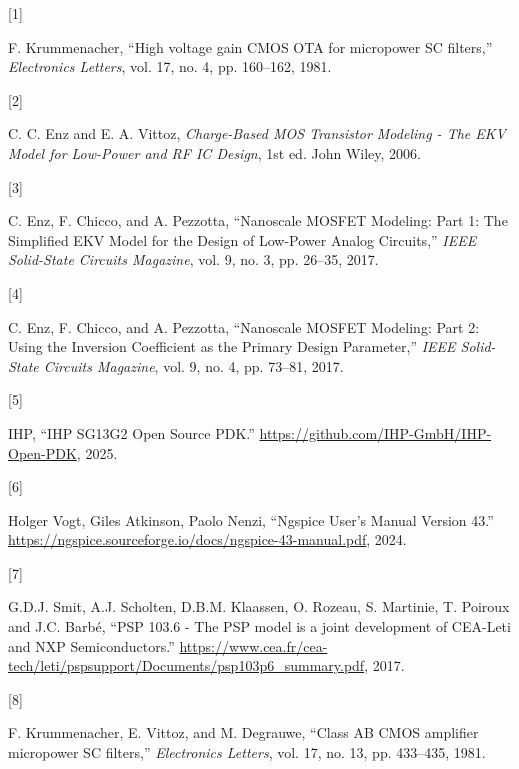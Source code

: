 \documentclass[
  a4paper,
  DIV=11,
  numbers=noendperiod]{scrreprt}
\newlength{\cslhangindent}
\newlength{\csllabelwidth}
\newenvironment{CSLReferences}[2] %
 {\begin{list}{}{%
  \setlength{\itemindent}{0pt}
  \setlength{\leftmargin}{0pt}
  \setlength{\parsep}{0pt}
  \ifodd #1
   \setlength{\leftmargin}{\cslhangindent}
   \setlength{\itemindent}{-1\cslhangindent}
  \fi
  \setlength{\itemsep}{#2\baselineskip}}}
 {\end{list}}
\newcommand{\CSLLeftMargin}[1]{\parbox[t]{\csllabelwidth}{\strut#1\strut}}
\newcommand{\CSLRightInline}[1]{\parbox[t]{\linewidth - \csllabelwidth}{\strut#1\strut}}
\begin{document}
\label{refs}
\begin{CSLReferences}{0}{0}
\CSLLeftMargin{{[}1{]} }%
\CSLRightInline{F. Krummenacher, {``{High voltage gain CMOS OTA for
micropower SC filters},''} \emph{Electronics Letters}, vol. 17, no. 4,
pp. 160--162, 1981.}

\CSLLeftMargin{{[}2{]} }%
\CSLRightInline{C. C. Enz and E. A. Vittoz, \emph{{Charge-Based MOS
Transistor Modeling - The EKV Model for Low-Power and RF IC Design}},
1st ed. John Wiley, 2006.}

\CSLLeftMargin{{[}3{]} }%
\CSLRightInline{C. Enz, F. Chicco, and A. Pezzotta, {``{Nanoscale MOSFET
Modeling: Part 1: The Simplified EKV Model for the Design of Low-Power
Analog Circuits},''} \emph{IEEE Solid-State Circuits Magazine}, vol. 9,
no. 3, pp. 26--35, 2017.}

\CSLLeftMargin{{[}4{]} }%
\CSLRightInline{C. Enz, F. Chicco, and A. Pezzotta, {``{Nanoscale MOSFET
Modeling: Part 2: Using the Inversion Coefficient as the Primary Design
Parameter},''} \emph{IEEE Solid-State Circuits Magazine}, vol. 9, no. 4,
pp. 73--81, 2017.}

\CSLLeftMargin{{[}5{]} }%
\CSLRightInline{IHP, {``{IHP SG13G2 Open Source PDK}.''}
\url{https://github.com/IHP-GmbH/IHP-Open-PDK}, 2025.}

\CSLLeftMargin{{[}6{]} }%
\CSLRightInline{Holger Vogt, Giles Atkinson, Paolo Nenzi, {``{Ngspice
User's Manual Version 43}.''}
\url{https://ngspice.sourceforge.io/docs/ngspice-43-manual.pdf}, 2024.}

\CSLLeftMargin{{[}7{]} }%
\CSLRightInline{G.D.J. Smit, A.J. Scholten, D.B.M. Klaassen, O. Rozeau,
S. Martinie, T. Poiroux and J.C. Barbé, {``{PSP 103.6 - The PSP model is
a joint development of CEA-Leti and NXP Semiconductors}.''}
\url{https://www.cea.fr/cea-tech/leti/pspsupport/Documents/psp103p6_summary.pdf},
2017.}

\CSLLeftMargin{{[}8{]} }%
\CSLRightInline{F. Krummenacher, E. Vittoz, and M. Degrauwe, {``{Class
AB CMOS amplifier micropower SC filters},''} \emph{Electronics Letters},
vol. 17, no. 13, pp. 433--435, 1981.}


\end{CSLReferences}
\end{document}

